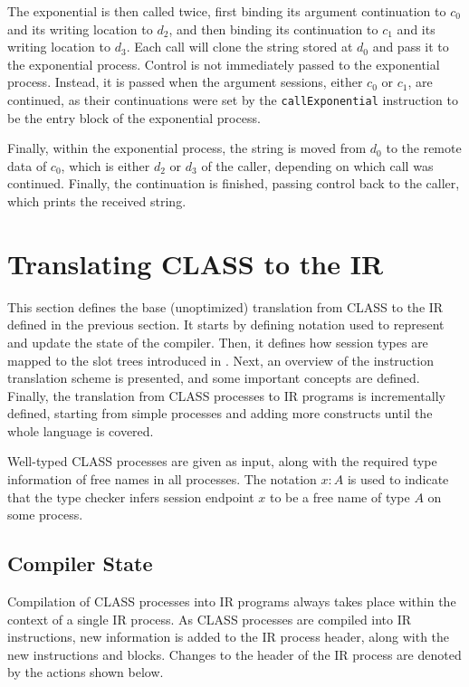 The exponential is then called twice, first binding its argument continuation to $c_0$ and its writing location to $d_2$, and then binding its continuation to $c_1$ and its writing location to $d_3$. Each call will clone the string stored at $d_0$ and pass it to the exponential process. Control is not immediately passed to the exponential process. Instead, it is passed when the argument sessions, either $c_0$ or $c_1$, are continued, as their continuations were set by the \texttt{callExponential} instruction to be the entry block of the exponential process.

Finally, within the exponential process, the string is moved from $d_0$ to the remote data of $c_0$, which is either $d_2$ or $d_3$ of the caller, depending on which call was continued. Finally, the continuation is finished, passing control back to the caller, which prints the received string.

\section{Translating CLASS to the IR} \label{section:IRGeneration}

This section defines the base (unoptimized) translation from \ac{CLASS} to the \ac{IR} defined in the previous section. It starts by defining notation used to represent and update the state of the compiler. Then, it defines how session types are mapped to the slot trees introduced in . Next, an overview of the instruction translation scheme is presented, and some important concepts are defined. Finally, the translation from \ac{CLASS} processes to \ac{IR} programs is incrementally defined, starting from simple processes and adding more constructs until the whole language is covered.

Well-typed \ac{CLASS} processes are given as input, along with the required type information of free names in all processes. The notation $x: A$ is used to indicate that the type checker infers session endpoint $x$ to be a free name of type $A$ on some process.

\subsection{Compiler State}

Compilation of \ac{CLASS} processes into \ac{IR} programs always takes place within the context of a single \ac{IR} process. As \ac{CLASS} processes are compiled into \ac{IR} instructions, new information is added to the \ac{IR} process header, along with the new instructions and blocks. Changes to the header of the \ac{IR} process are denoted by the actions shown below.

